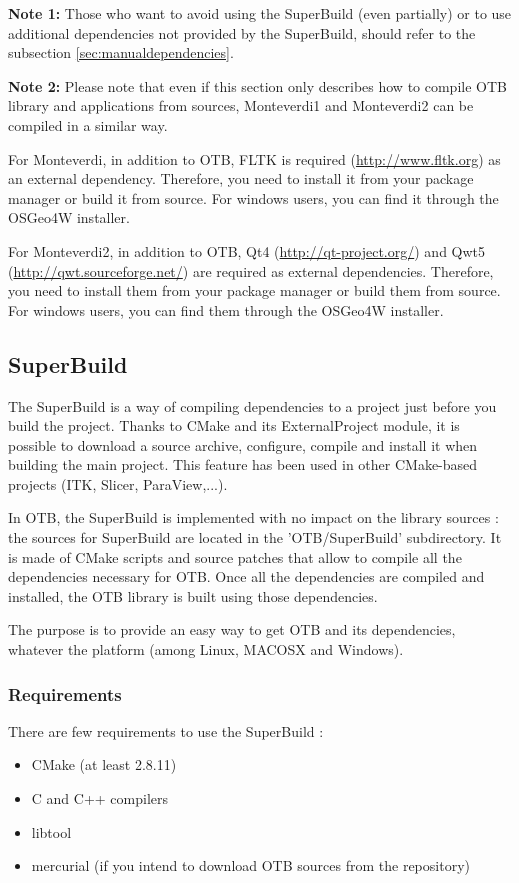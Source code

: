 \textbf{Note 1:} Those who want to avoid using the SuperBuild (even partially) or to use additional dependencies not provided by the SuperBuild, should refer to the subsection \ref{sec:manualdependencies}. 



\textbf{Note 2:} 
Please note that even if this section only describes how to compile OTB library and applications from sources, Monteverdi1 and Monteverdi2 can be compiled in a similar way.

For Monteverdi, in addition to OTB, FLTK is required (\url{http://www.fltk.org}) as an external dependency. Therefore, you need to install it from your package manager or build it from source. For windows users, you can find it through the OSGeo4W installer.

For Monteverdi2, in addition to OTB, Qt4 (\url{http://qt-project.org/}) and Qwt5 (\url{http://qwt.sourceforge.net/}) are required as external dependencies. Therefore, you need to install them from your package manager or build them from source. For windows users, you can find them through the OSGeo4W installer.


\subsection{SuperBuild}
\label{sec:SuperBuild}

The SuperBuild is a way of compiling dependencies to a project just before you build the project. Thanks to CMake and its ExternalProject module, it is possible to download a source archive, configure, compile and install it when building the main project. This feature has been used in other CMake-based projects (ITK, Slicer, ParaView,...).

In OTB, the SuperBuild is implemented with no impact on the library sources : the sources for SuperBuild are located in the 'OTB/SuperBuild' subdirectory. It is made of CMake scripts and source patches that allow to compile all the dependencies necessary for OTB. Once all the dependencies are compiled and installed, the OTB library is built using those dependencies.

The purpose is to provide an easy way to get OTB and its dependencies, whatever the platform (among Linux, MACOSX and Windows). 

\subsubsection{Requirements}
There are few requirements to use the SuperBuild :
\begin{itemize}
	\item CMake (at least 2.8.11)
	\item C and C++ compilers
	\item libtool
	\item mercurial (if you intend to download OTB sources from the repository) 
\end{itemize}

